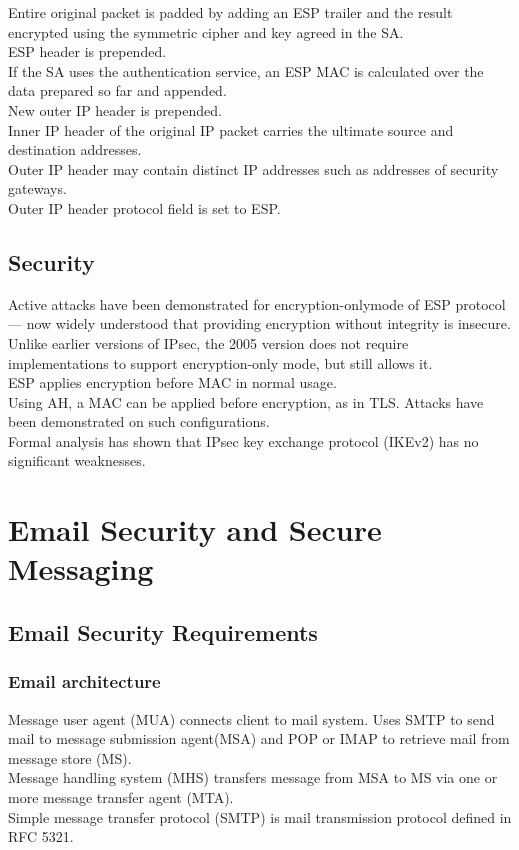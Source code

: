 \documentclass{article}
\begin{document}
Entire original packet is padded by adding an ESP trailer and the result encrypted using the symmetric cipher and key agreed in the SA.\\
ESP header is prepended.\\
If the SA uses the authentication service, an ESP MAC is calculated over the data prepared so far and appended.\\
New outer IP header is prepended.\\
Inner IP header of the original IP packet carries the ultimate source and destination addresses.\\
Outer IP header may contain distinct IP addresses such as addresses of security gateways.\\
Outer IP header protocol field is set to ESP.

\subsection{Security}

Active attacks have been demonstrated for encryption-onlymode of ESP protocol — now widely understood that providing encryption without integrity is insecure.\\
Unlike earlier versions of IPsec, the 2005 version does not require implementations to support encryption-only mode, but still allows it.\\
ESP applies encryption before MAC in normal usage.\\
Using AH, a MAC can be applied before encryption, as in TLS. Attacks have been demonstrated on such configurations.\\
Formal analysis has shown that IPsec key exchange protocol (IKEv2) has no significant weaknesses.

\newpage
\section{Email Security and Secure Messaging}

\subsection{Email Security Requirements}

\subsubsection{Email architecture}

Message user agent (MUA) connects client to mail system. Uses SMTP to send mail to message submission agent(MSA) and POP or IMAP to retrieve mail from message store (MS).\\
Message handling system (MHS) transfers message from MSA to MS via one or more message transfer agent (MTA).\\
Simple message transfer protocol (SMTP) is mail transmission protocol defined in RFC 5321.
\end{document}
